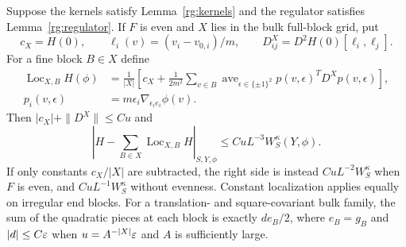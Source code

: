 \begin{lemma}\label{rg:localization}
Suppose the kernels satisfy Lemma~\ref{rg:kernels} and the regulator satisfies Lemma~\ref{rg:regulator}.  If $F$ is even and $X$ lies in the bulk full-block grid, put
\[
 c_X=H(0),\qquad \ell_i(v)=(v_i-v_{0,i})/m,\qquad
 D^X_{ij}=D^2H(0)[\ell_i,\ell_j].
\]
For a fine block $B\in X$ define
\begin{equation}\label{rg:quadratic-localization}
 \begin{aligned}
 \operatorname{Loc}_{X,B}H(\phi)&=\frac1{|X|}\left[c_X+
 \frac1{2m^2}\sum_{v\in B}\operatorname{ave}_{\epsilon\in\{\pm1\}^2}
 p(v,\epsilon)^TD^Xp(v,\epsilon)\right],\\
 p_i(v,\epsilon)&=m\epsilon_i\nabla_{\epsilon_i e_i}\phi(v).
 \end{aligned}
\end{equation}
Then $|c_X|+\|D^X\|\le Cu$ and
\begin{equation}\label{rg:neutral-gain}
 \left|H-\sum_{B\in X}\operatorname{Loc}_{X,B}H\right|_{S,Y,\phi}
 \le CuL^{-3}W_S^\kappa(Y,\phi).
\end{equation}
If only constants $c_X/|X|$ are subtracted, the right side is instead $CuL^{-2}W_S^\kappa$ when $F$ is even, and $CuL^{-1}W_S^\kappa$ without evenness.  Constant localization applies equally on irregular end blocks.  For a translation- and square-covariant bulk family, the sum of the quadratic pieces at each block is exactly $d e_B/2$, where $e_B=g_B$ and $|d|\le C\varepsilon$ when $u=A^{-|X|}\varepsilon$ and $A$ is sufficiently large.
\end{lemma}

